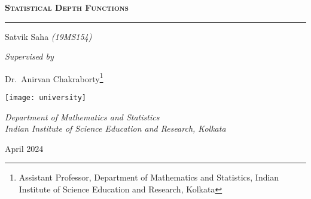 \begin{titlepage}
    \vspace*{2cm}


    {\noindent\Huge\scshape\bfseries%
        Statistical Depth Functions
    }

    \vspace{0.8cm}
    \hrule
    \vspace{0.4cm}

    {\noindent\Large Satvik Saha \textcolor{black!70!white}{\textit{(19MS154)}}}
    \vspace{0.6cm}

    {\noindent\Large\itshape Supervised by}
    \vspace{0.1cm}

    \renewcommand*{\thefootnote}{\fnsymbol{footnote}}
    {\noindent\Large Dr.~Anirvan Chakraborty\footnote{Assistant Professor, Department of Mathematics and Statistics, Indian Institute of Science Education and Research, Kolkata}}

    \vfill

    \noindent\texttt{[image: university]}

    \vspace{0.2cm}

    {\noindent\large\itshape
        Department of Mathematics and Statistics \vspace{0.2em}\\
        Indian Institute of Science Education and Research, Kolkata \\
    }
    \vspace{0.8cm}

    {\noindent\large April 2024}

    \vspace*{2cm}
\end{titlepage}
